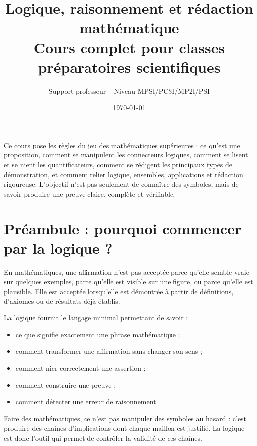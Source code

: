 \documentclass[11pt,a4paper]{article}
\title{\vspace{-1cm}\Huge\bfseries Logique, raisonnement et rédaction mathématique\\[0.2cm]
\Large Cours complet pour classes préparatoires scientifiques}
\author{Support professeur -- Niveau MPSI/PCSI/MP2I/PSI}
\date{\today}
\begin{document}
\maketitle
\thispagestyle{empty}

\begin{center}
\begin{tcolorbox}[width=0.92\textwidth,colframe=bleuprepa,colback=blue!2!white,title=Objectif du polycopié]
Ce cours pose les règles du jeu des mathématiques supérieures : ce qu'est une proposition, comment se manipulent les connecteurs logiques, comment se lisent et se nient les quantificateurs, comment se rédigent les principaux types de démonstration, et comment relier logique, ensembles, applications et rédaction rigoureuse. L'objectif n'est pas seulement de connaître des symboles, mais de savoir produire une preuve claire, complète et vérifiable.
\end{tcolorbox}
\end{center}

\tableofcontents
\newpage

\section*{Préambule : pourquoi commencer par la logique ?}

En mathématiques, une affirmation n'est pas acceptée parce qu'elle semble vraie sur quelques exemples, parce qu'elle est visible sur une figure, ou parce qu'elle est plausible. Elle est acceptée lorsqu'elle est démontrée à partir de définitions, d'axiomes ou de résultats déjà établis.

La logique fournit le langage minimal permettant de savoir :
\begin{itemize}
  \item ce que signifie exactement une phrase mathématique ;
  \item comment transformer une affirmation sans changer son sens ;
  \item comment nier correctement une assertion ;
  \item comment construire une preuve ;
  \item comment détecter une erreur de raisonnement.
\end{itemize}

\begin{retenirbox}
Faire des mathématiques, ce n'est pas manipuler des symboles au hasard : c'est produire des chaînes d'implications dont chaque maillon est justifié. La logique est donc l'outil qui permet de contrôler la validité de ces chaînes.
\end{retenirbox}
\end{document}
